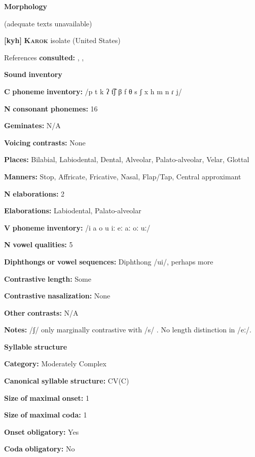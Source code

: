 \textbf{Morphology}

(adequate texts unavailable)

\textbf{[kyh]}   \textbf{\textsc{Karok}}  isolate (United States)

References \textbf{consulted:} \citet{AnguloFreeland1971}, \citet{Bright1957}, \citet{Sandy2014}

\textbf{Sound} \textbf{inventory}

\textbf{C} \textbf{phoneme} \textbf{inventory:} /p t k ʔ t͡ʃ β f θ s ʃ x h m n ɾ j/

\textbf{N} \textbf{consonant} \textbf{phonemes:} 16

\textbf{Geminates:} N/A

\textbf{Voicing} \textbf{contrasts:} None

\textbf{Places:} Bilabial, Labiodental, Dental, Alveolar, Palato-alveolar, Velar, Glottal

\textbf{Manners:} Stop, Affricate, Fricative, Nasal, Flap/Tap, Central approximant

\textbf{N} \textbf{elaborations:} 2

\textbf{Elaborations:} Labiodental, Palato-alveolar

\textbf{V} \textbf{phoneme} \textbf{inventory:} /i a o u iː eː aː oː uː/

\textbf{N} \textbf{vowel} \textbf{qualities:} 5

\textbf{Diphthongs} \textbf{or} \textbf{vowel} \textbf{sequences:} Diphthong /ui/, perhaps more

\textbf{Contrastive} \textbf{length:} Some

\textbf{Contrastive} \textbf{nasalization:} None

\textbf{Other} \textbf{contrasts:} N/A

\textbf{Notes:} /ʃ/ only marginally contrastive with /s/ \citep[17]{Bright1957}. No length distinction in /eː/.

\textbf{Syllable} \textbf{structure}

\textbf{Category:} Moderately Complex

\textbf{Canonical} \textbf{syllable} \textbf{structure:} CV(C) \citep[11]{Bright1957}

\textbf{Size} \textbf{of} \textbf{maximal} \textbf{onset:} 1

\textbf{Size} \textbf{of} \textbf{maximal} \textbf{coda:} 1

\textbf{Onset} \textbf{obligatory:} Yes

\textbf{Coda} \textbf{obligatory:} No

